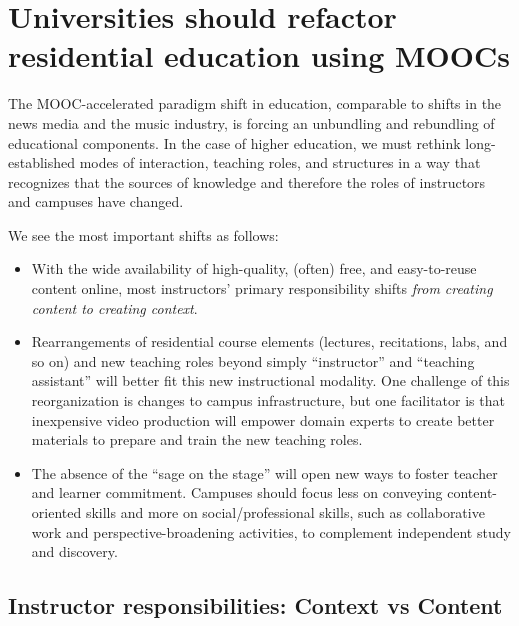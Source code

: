 \section{Universities should refactor residential education using MOOCs}



The MOOC-accelerated paradigm shift in education, comparable to shifts
in the news media and the music industry,
is forcing an unbundling and rebundling of educational components. In the
case of higher education, 
we must rethink long-established modes of interaction, teaching roles,
and structures in a way that recognizes
that the sources of knowledge and therefore the roles of instructors and
campuses have changed.

We see the most important shifts as follows:

\begin{itemize}

\item With the wide availability of high-quality, (often) free, and
easy-to-reuse content online, most instructors' primary responsibility
shifts \emph{from creating content to creating context}.

\item Rearrangements of residential course elements (lectures,
  recitations, labs, and so on) and new teaching roles beyond simply ``instructor''
  and ``teaching assistant'' will better fit this new instructional
  modality.  One challenge of this reorganization is changes to campus
  infrastructure, but one facilitator is that inexpensive video production
  will empower domain experts to create 
  better materials to prepare and train the new teaching roles.

\item The absence of the ``sage on the stage'' will open new ways to
foster teacher and learner commitment.  Campuses should
focus less on conveying content-oriented skills and more on
social/professional skills, such as collaborative work and
perspective-broadening activities, to complement  independent study
and discovery.

\end{itemize} 

\subsection{Instructor responsibilities: Context vs Content}


